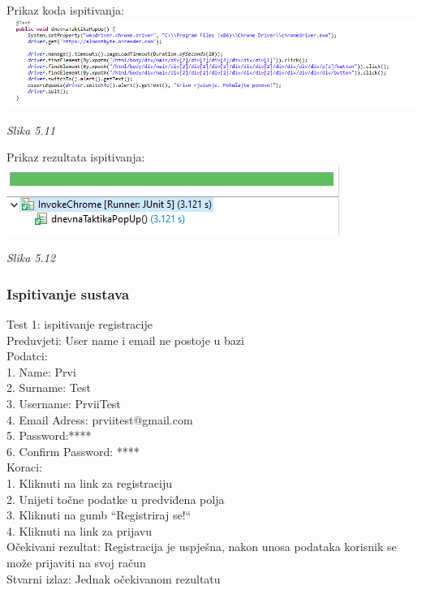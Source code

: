 \documentclass{article}
\begin{document}
		Prikaz koda ispitivanja:\\
	\includegraphics[width=\columnwidth]{dnevnaTaktika_}
	\begin{center}
		\textit{Slika 5.11}
	\end{center}
	Prikaz rezultata ispitivanja:\\
	\includegraphics[width=\columnwidth]{dnevnaTaktika-true}
	\begin{center}
		\textit{Slika 5.12}
	\end{center}
	\eject
	\subsubsection{Ispitivanje sustava}
	Test 1: ispitivanje registracije\\
	Preduvjeti: User name i email ne postoje u bazi\\
	Podatci: \\
		1.	Name: Prvi \\
		2.	Surname: Test\\
		3.	Username: PrviiTest\\
		4.	Email Adress: prviitest@gmail.com\\
		5.	Password:****\\
		6.	Confirm Password: ****\\
	Koraci:\\
		1. Kliknuti na link za registraciju\\
		2. Unijeti točne podatke u predviđena polja\\
		3. Kliknuti na gumb “Registriraj se!“\\
		4. Kliknuti na link za prijavu\\
	
	Očekivani rezultat: Registracija je uspješna, nakon unosa podataka korisnik se može prijaviti na svoj račun \\
	Stvarni izlaz: Jednak očekivanom rezultatu\\
	
\end{document}
